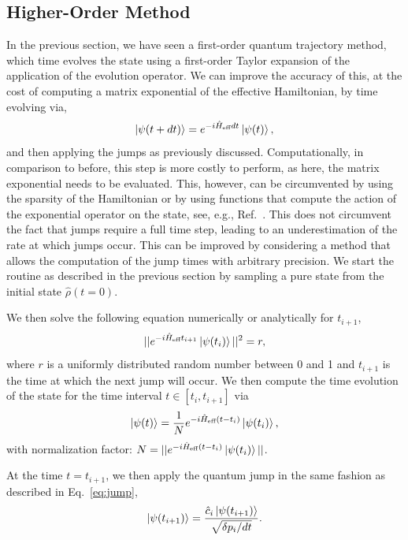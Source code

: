 \subsection{Higher-Order Method}
\label{subsec:higher_order}
In the previous section, we have seen a first-order quantum trajectory method, which time evolves the state using a first-order Taylor expansion of the application of the evolution operator. We can improve the accuracy of this, at the cost of computing a matrix exponential of the effective Hamiltonian, by time evolving via, 
\begin{equation}
	\ket{\psi(t+dt)} = e^{- i \hat{H}_\text{eff} dt} \ket{\psi(t)},
\end{equation}
and then applying the jumps as previously discussed. Computationally, in comparison to before, this step is more costly to perform, as here, the matrix exponential needs to be evaluated. This, however, can be circumvented by using the sparsity of the Hamiltonian or by using functions that compute the action of the exponential operator on the state, see, e.g., Ref.~\cite{expv}. This does not circumvent the fact that jumps require a full time step, leading to an underestimation of the rate at which jumps occur. This can be improved by considering a method that allows the computation of the jump times with arbitrary precision. We start the routine as described in the previous section by sampling a pure state from the initial state $\hat{\rho}(t=0)$. 

We then solve the following equation numerically or analytically for $t_{i+1}$,
\begin{equation}
\label{eq:jumptime}
	||e^{-i \hat{H}_\text{eff} t_{i+1}} \ket{\psi(t_i)} ||^2 = r,
\end{equation}
where $r$ is a uniformly distributed random number between 0 and 1 and $t_{i+1}$ is the time at which the next jump will occur. 
We then compute the time evolution of the state for the time interval $t \in [t_i, t_{i+1}]$ via
\begin{equation}
	\ket{\psi(t)} = \frac{1}{N}  e^{- i \hat{H}_\text{eff} (t -t_i)} \ket{\psi(t_i)},
\end{equation}
with normalization factor: $N = || e^{- i \hat{H}_\text{eff} (t -t_i)} \ket{\psi(t_i)} ||$.

At the time $t = t_{i+1}$, we then apply the quantum jump in the same fashion as described in Eq.~\ref{eq:jump},
	\begin{equation}
	\label{eq:jump_higher}
	\ket{\psi(t_{i+1})} = \frac{	\hat{c}_i \ket{\psi(t_{i+1})} }{\sqrt{\delta p_i/dt}}.
	\end{equation}

